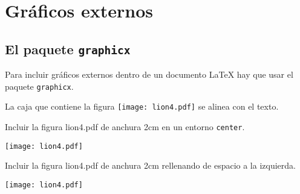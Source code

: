 \documentclass[11pt, a4paper]{article}
\begin{document}
\section{Gráficos externos}





\subsection{El paquete \texttt{graphicx}}





Para incluir gráficos externos dentro de un documento \LaTeX{} hay que usar el paquete \texttt{graphicx}.






La caja que contiene la figura \texttt{[image: lion4.pdf]}
 se alinea con el texto.





\bigskip
Incluir la figura lion4.pdf de anchura 2cm en un entorno \texttt{center}.

\begin{center}
\texttt{[image: lion4.pdf]}
\end{center}





Incluir la figura lion4.pdf de anchura 2cm rellenando de espacio a la izquierda.

\begin{flushright}
\texttt{[image: lion4.pdf]}
\end{flushright}
\end{document}
